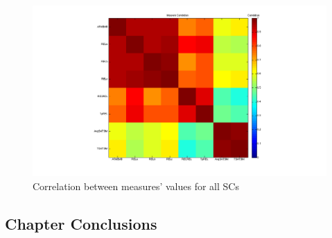 \documentclass{article}
\begin{document}
\begin{figure}[htb]
\centering
\includegraphics[scale=0.2]{../plots/Measure_Correlation_All.png}
\caption{\label{fig:measurecorrall}Correlation between measures' values for all SCs}
\end{figure}
\subsection{Chapter Conclusions}
\label{sec-7-9}
\end{document}
